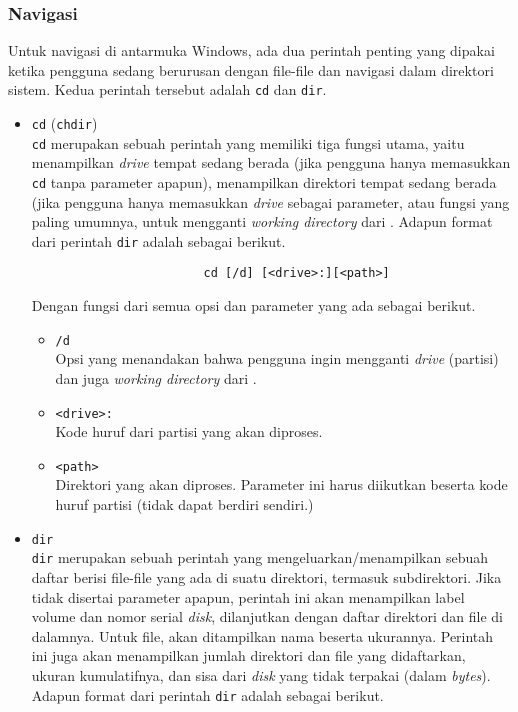 \subsubsection{Navigasi}
\label{sec:commandline-windows-nav}

Untuk navigasi di antarmuka \cl Windows, ada dua perintah penting yang dipakai ketika pengguna sedang berurusan dengan file-file dan navigasi dalam direktori sistem. Kedua perintah tersebut adalah \verb|cd| dan \verb|dir|.

\begin{itemize}
	\item \verb|cd| (\verb|chdir|) \cite{microsoftdocs:2021:cd}\\
	\verb|cd| merupakan sebuah perintah yang memiliki tiga fungsi utama, yaitu menampilkan \textit{drive} tempat sedang \cl berada (jika pengguna hanya memasukkan \verb|cd| tanpa parameter apapun), menampilkan direktori tempat \cl sedang berada (jika pengguna hanya memasukkan \textit{drive} sebagai parameter, atau fungsi yang paling umumnya, untuk mengganti \textit{working directory} dari \cl.
	\newline\newline
	Adapun format dari perintah \verb|dir| adalah sebagai berikut.
	
	\begin{verbatim}
                        cd [/d] [<drive>:][<path>]
	\end{verbatim}
	
	\newpage %
	Dengan fungsi dari semua opsi dan parameter yang ada sebagai berikut.
	
	\begin{itemize}
		\item \verb|/d|\\
		Opsi yang menandakan bahwa pengguna ingin mengganti \textit{drive} (partisi) dan juga \textit{working directory} dari \cl.
		\item \verb|<drive>:|\\
		Kode huruf dari partisi yang akan diproses.
		\item \verb|<path>|\\
		Direktori yang akan diproses. Parameter ini harus diikutkan beserta kode huruf partisi (tidak dapat berdiri sendiri.)
	\end{itemize}
	
	\item \verb|dir|\\
	\verb|dir| merupakan sebuah perintah yang mengeluarkan/menampilkan sebuah daftar berisi file-file yang ada di suatu direktori, termasuk subdirektori. Jika tidak disertai parameter apapun, perintah ini akan menampilkan label volume dan nomor serial \textit{disk}, dilanjutkan dengan daftar direktori dan file di dalamnya. Untuk file, akan ditampilkan nama beserta ukurannya. Perintah ini juga akan menampilkan jumlah direktori dan file yang didaftarkan, ukuran kumulatifnya, dan sisa dari \textit{disk} yang tidak terpakai (dalam \textit{bytes}).\cite{microsoftdocs:2021:dir}
	\newline\newline
	Adapun format dari perintah \verb|dir| adalah sebagai berikut.\cite{mueller:2007:windowscommandline}
	

\end{itemize}
